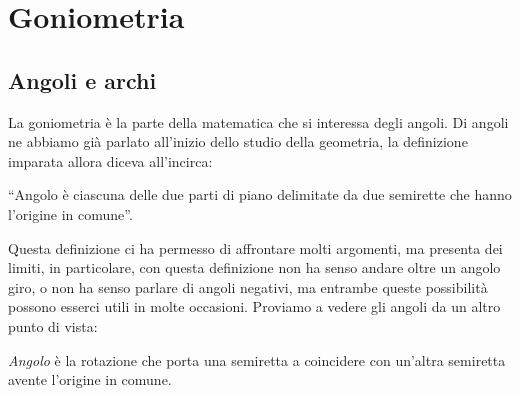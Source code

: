 
\chapter{Goniometria}

\section{Angoli e archi}
\label{sec:gonio_angoli_archi}

%  
%  
% 
%  

La goniometria è la parte della matematica che si interessa degli angoli. 
Di angoli ne abbiamo già parlato all'inizio dello studio della geometria, 
la definizione imparata allora diceva all'incirca:

``Angolo è ciascuna delle due parti di piano delimitate da due semirette
che hanno l'origine in comune''.

Questa definizione ci ha permesso di affrontare molti argomenti, ma presenta 
dei limiti, in particolare, con questa definizione non ha senso andare oltre
un angolo giro, o non ha senso parlare di angoli negativi, ma entrambe queste 
possibilità possono esserci utili in molte occasioni. 
Proviamo a vedere gli angoli da un altro punto di vista:

\begin{definizione}
 \emph{Angolo} è la rotazione che porta una semiretta a coincidere con un'altra 
 semiretta avente l'origine in comune.
\end{definizione}

